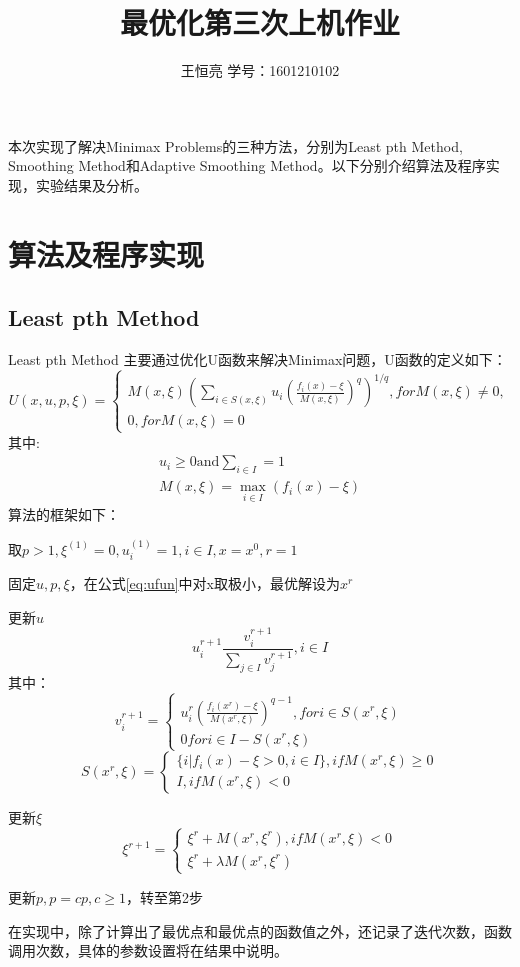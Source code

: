 \documentclass{ctexart}
\begin{document}
\title{最优化第三次上机作业}
\author{王恒亮 \quad 学号：1601210102}
\date{}
\maketitle
本次实现了解决Minimax Problems的三种方法，分别为Least pth Method\cite{Charalambous1979}, Smoothing Method\cite{Xu2001}和Adaptive Smoothing Method\cite{Polak2003}。以下分别介绍算法及程序实现，实验结果及分析。
\section{算法及程序实现}
\subsection{Least pth Method}
Least pth Method 主要通过优化U函数来解决Minimax问题，U函数的定义如下：
\begin{equation}
	\label{eq:ufun}
	U(x,u,p,\xi)=\left\{
		\begin{align}
			M(x,\xi)(\sum_{i\in S(x,\xi)}{u_i(\frac{f_i(x)-\xi}{M(x,\xi)})^q})^{1/q}, for M(x,\xi) \neq 0,\\
		0, for M(x,\xi) = 0
		\end{align}\right.
\end{equation}
其中:
\begin{align}
	u_i \geq 0 \text{and} \sum_{i\in I} = 1\\
	M(x, \xi) = \max_{i\in I}{(f_i(x) - \xi)}
\end{align}
算法的框架如下：
\begin{description}
\item 取$p>1, \xi^{(1)} =0,u_i^{(1)}=1,i\in I,x=x^0,r=1$
\item 固定$u,p,\xi$，在公式\ref{eq:ufun}中对x取极小，最优解设为$x^r$
\item 更新$u$
	\[u^{r+1}_i\frac{v_i^{r+1}}{\sum_{j\in I}{v_j^{r+1}}}, i\in I\]
	其中：
	\[v_{i}^{r+1}=\left\{
		\begin{align}
			u_i^r(\frac{f_i(x^r)-\xi}{M(x^r,\xi)})^{q-1}, for i \in S(x^r,\xi)\\
			0 for i\in I - S(x^r, \xi)
		\end{align}\right.\]
	\[S(x^r, \xi)=\left\{
		\begin{align}
			\{i|f_i(x)-\xi>0,i\in I\}, if M(x^r,\xi) \geq 0\\
			I, if M(x^r,\xi) <0
		\end{align}\right.\]
\item 更新$\xi$
	\[\xi^{r+1} = \left\{
		\begin{align}
			\xi^r + M(x^r, \xi^r) , if M(x^r, \xi) < 0\\
			\xi^r + \lambda M(x^r, \xi^r)
		\end{align}\right.\]
\item 更新$p, p = cp, c\geq 1$，转至第2步
\end{description}
在实现中，除了计算出了最优点和最优点的函数值之外，还记录了迭代次数，函数调用次数，具体的参数设置将在结果中说明。
\end{document}
